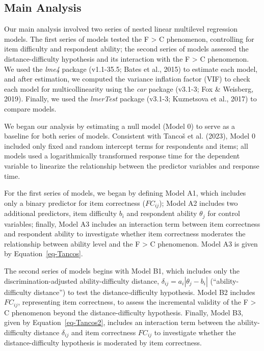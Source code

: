 \documentclass[
  number]{elsarticle}
\begin{document}
\subsection{Main Analysis}\label{main-analysis}

Our main analysis involved two series of nested linear multilevel
regression models. The first series of models tested the F
\textgreater{} C phenomenon, controlling for item difficulty and
respondent ability; the second series of models assessed the
distance-difficulty hypothesis and its interaction with the F
\textgreater{} C phenomenon. We used the \emph{lme4} package (v1.1-35.5;
Bates et al., 2015) to estimate each model, and after estimation, we
computed the variance inflation factor (VIF) to check each model for
multicollinearity using the \emph{car} package (v3.1-3; Fox \& Weisberg,
2019). Finally, we used the \emph{lmerTest} package (v3.1-3; Kuznetsova
et al., 2017) to compare models.

We began our analysis by estimating a null model (Model 0) to serve as a
baseline for both series of models. Consistent with Tancoš et al.
(2023), Model 0 included only fixed and random intercept terms for
respondents and items; all models used a logarithmically transformed
response time for the dependent variable to linearize the relationship
between the predictor variables and response time.

For the first series of models, we began by defining Model A1, which
includes only a binary predictor for item correctness (\(FC_{ij}\));
Model A2 includes two additional predictors, item difficulty \(b_i\) and
respondent ability \(\theta_j\) for control variables; finally, Model A3
includes an interaction term between item correctness and respondent
ability to investigate whether item correctness moderates the
relationship between ability level and the F \textgreater{} C
phenomenon. Model A3 is given by Equation~\ref{eq-Tancos}.

The second series of models begins with Model B1, which includes only
the discrimination-adjusted ability-difficulty distance,
\(\delta_{ij}=a_i |\theta_j-b_i|\) (``ability-difficulty distance'') to
test the distance-difficulty hypothesis. Model B2 includes \(FC_{ij}\),
representing item correctness, to assess the incremental validity of the
F \textgreater{} C phenomenon beyond the distance-difficulty hypothesis.
Finally, Model B3, given by Equation~\ref{eq-Tancos2}, includes an
interaction term between the ability-difficulty distance \(\delta_{ij}\)
and item correctness \(FC_{ij}\) to investigate whether the
distance-difficulty hypothesis is moderated by item correctness.
\end{document}
